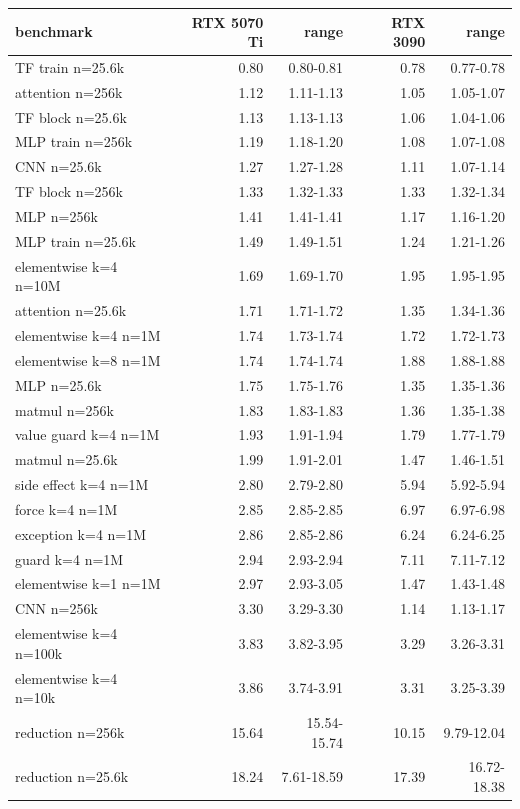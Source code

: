 \begin{tabular}{lrrrr}
\toprule
benchmark & RTX 5070 Ti & range & RTX 3090 & range \\
\midrule
TF train n=25.6k & 0.80 & 0.80-0.81 & 0.78 & 0.77-0.78 \\
attention n=256k & 1.12 & 1.11-1.13 & 1.05 & 1.05-1.07 \\
TF block n=25.6k & 1.13 & 1.13-1.13 & 1.06 & 1.04-1.06 \\
MLP train n=256k & 1.19 & 1.18-1.20 & 1.08 & 1.07-1.08 \\
CNN n=25.6k & 1.27 & 1.27-1.28 & 1.11 & 1.07-1.14 \\
TF block n=256k & 1.33 & 1.32-1.33 & 1.33 & 1.32-1.34 \\
MLP n=256k & 1.41 & 1.41-1.41 & 1.17 & 1.16-1.20 \\
MLP train n=25.6k & 1.49 & 1.49-1.51 & 1.24 & 1.21-1.26 \\
elementwise k=4 n=10M & 1.69 & 1.69-1.70 & 1.95 & 1.95-1.95 \\
attention n=25.6k & 1.71 & 1.71-1.72 & 1.35 & 1.34-1.36 \\
elementwise k=4 n=1M & 1.74 & 1.73-1.74 & 1.72 & 1.72-1.73 \\
elementwise k=8 n=1M & 1.74 & 1.74-1.74 & 1.88 & 1.88-1.88 \\
MLP n=25.6k & 1.75 & 1.75-1.76 & 1.35 & 1.35-1.36 \\
matmul n=256k & 1.83 & 1.83-1.83 & 1.36 & 1.35-1.38 \\
value guard k=4 n=1M & 1.93 & 1.91-1.94 & 1.79 & 1.77-1.79 \\
matmul n=25.6k & 1.99 & 1.91-2.01 & 1.47 & 1.46-1.51 \\
side effect k=4 n=1M & 2.80 & 2.79-2.80 & 5.94 & 5.92-5.94 \\
force k=4 n=1M & 2.85 & 2.85-2.85 & 6.97 & 6.97-6.98 \\
exception k=4 n=1M & 2.86 & 2.85-2.86 & 6.24 & 6.24-6.25 \\
guard k=4 n=1M & 2.94 & 2.93-2.94 & 7.11 & 7.11-7.12 \\
elementwise k=1 n=1M & 2.97 & 2.93-3.05 & 1.47 & 1.43-1.48 \\
CNN n=256k & 3.30 & 3.29-3.30 & 1.14 & 1.13-1.17 \\
elementwise k=4 n=100k & 3.83 & 3.82-3.95 & 3.29 & 3.26-3.31 \\
elementwise k=4 n=10k & 3.86 & 3.74-3.91 & 3.31 & 3.25-3.39 \\
reduction n=256k & 15.64 & 15.54-15.74 & 10.15 & 9.79-12.04 \\
reduction n=25.6k & 18.24 & 7.61-18.59 & 17.39 & 16.72-18.38 \\
\bottomrule
\end{tabular}
